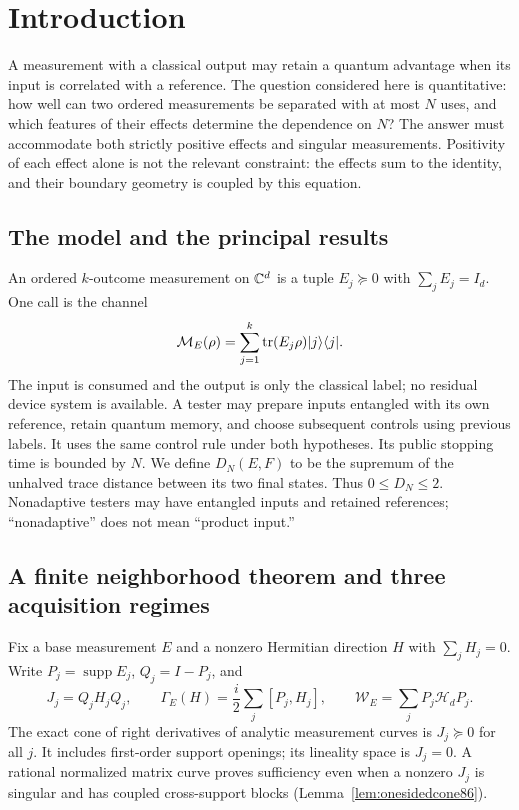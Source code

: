 \section{Introduction}\label{sec:introduction84}
A measurement with a classical output may retain a quantum advantage
when its input is correlated with a reference.  The question considered
here is quantitative: how well can two ordered measurements be
separated with at most $N$ uses, and which features of their effects
determine the dependence on $N$?  The answer must accommodate both
strictly positive effects and singular measurements.  Positivity of
each effect alone is not the relevant constraint: the effects sum to
the identity, and their boundary geometry is coupled by this equation.

\subsection{The model and the principal results}
An ordered $k$-outcome measurement on $\mathbb C^d$ is a tuple
$E_j\succeq0$ with $\sum_jE_j=I_d$.  One call is the channel
\[
 \mathcal M_E(\rho)=\sum_{j=1}^k\operatorname{tr}(E_j\rho)|j\rangle\langle j|.
\]
The input is consumed and the output is only the classical label;
no residual device system is available.  A tester may prepare inputs
entangled with its own reference, retain quantum memory, and choose
subsequent controls using previous labels.  It uses the same control
rule under both hypotheses.  Its public stopping time is bounded
by $N$.  We define $D_N(E,F)$ to be the supremum of the unhalved
trace distance between its two final states.  Thus $0\le D_N\le2$.
Nonadaptive testers may have entangled inputs and retained references;
``nonadaptive'' does not mean ``product input.''

\subsection{A finite neighborhood theorem and three acquisition regimes}
Fix a base measurement $E$ and a nonzero Hermitian direction $H$ with
$\sum_jH_j=0$.  Write $P_j=\operatorname{supp}E_j$, $Q_j=I-P_j$, and
\[
 J_j=Q_jH_jQ_j,\qquad
 \Gamma_E(H)=\frac i2\sum_j[P_j,H_j],\qquad
 \mathcal W_E=\sum_jP_j\mathcal H_dP_j.
\]
The exact cone of right derivatives of analytic measurement curves is
$J_j\succeq0$ for all $j$.  It includes first-order support openings;
its lineality space is $J_j=0$.  A rational normalized matrix curve
proves sufficiency even when a nonzero $J_j$ is singular and has
coupled cross-support blocks (Lemma~\ref{lem:onesidedcone86}).


